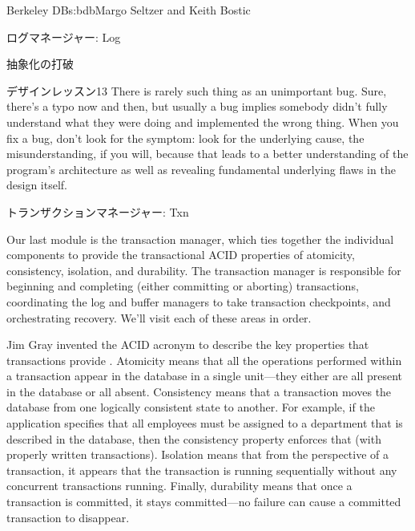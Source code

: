 \begin{aosachapter}{Berkeley DB}{s:bdb}{Margo Seltzer and Keith Bostic}
\begin{aosasect1}{ログマネージャー: Log}
\begin{aosasect2}{抽象化の打破}
\begin{aosabox}{デザインレッスン13}
There is rarely such thing as an unimportant bug. Sure, there's a typo
now and then, but usually a bug implies somebody didn't fully
understand what they were doing and implemented the wrong thing.
When you fix a bug, don't look for the symptom: look for the
underlying cause, the misunderstanding, if you will, because that
leads to a better understanding of the program's architecture as well
as revealing fundamental underlying flaws in the design itself.

\end{aosabox}

\end{aosasect2}

\end{aosasect1}

\begin{aosasect1}{トランザクションマネージャー: Txn}

Our last module is the transaction manager, which ties together the
individual components to provide the transactional ACID properties of
atomicity, consistency, isolation, and durability. The transaction
manager is responsible for beginning and completing (either committing
or aborting) transactions, coordinating the log and buffer managers to
take transaction checkpoints, and orchestrating recovery. We'll visit
each of these areas in order.


Jim Gray invented the ACID acronym to
describe the key properties that transactions provide \cite{bib:gray:trans}.  Atomicity
means that all the operations performed within a transaction appear in
the database in a single unit---they either are all present in the
database or all absent. Consistency means that a transaction moves the
database from one logically consistent state to another. For example,
if the application specifies that all employees must be assigned to a
department that is described in the database, then the consistency
property enforces that (with properly written transactions). Isolation
means that from the perspective of a transaction, it appears that the
transaction is running sequentially without any concurrent
transactions running. Finally, durability means that once a
transaction is committed, it stays committed---no failure can cause a
committed transaction to disappear.


\end{aosasect1}
\end{aosachapter}

